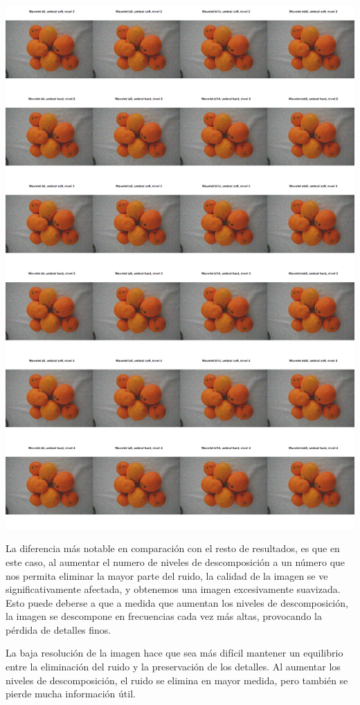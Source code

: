\documentclass[
]{article}
\begin{document}
\begin{center}\includegraphics[width=1\linewidth]{denoisedwt2d/image5_denoised} \end{center}

La diferencia más notable en comparación con el resto de resultados, es
que en este caso, al aumentar el numero de niveles de descomposición a
un número que nos permita eliminar la mayor parte del ruido, la calidad
de la imagen se ve significativamente afectada, y obtenemos una imagen
excesivamente suavizada. Esto puede deberse a que a medida que aumentan
los niveles de descomposición, la imagen se descompone en frecuencias
cada vez más altas, provocando la pérdida de detalles finos.

La baja resolución de la imagen hace que sea más difícil mantener un
equilibrio entre la eliminación del ruido y la preservación de los
detalles. Al aumentar los niveles de descomposición, el ruido se elimina
en mayor medida, pero también se pierde mucha información útil.
\end{document}
